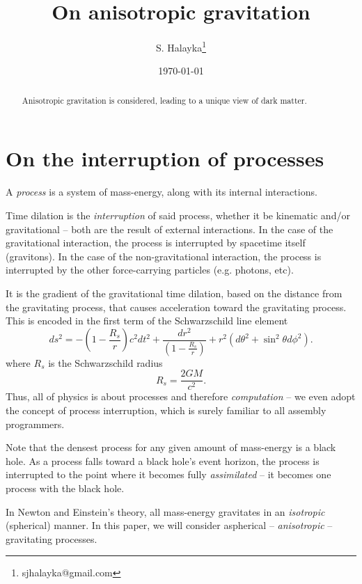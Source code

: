 \documentclass[12pt]{article}
\title{On anisotropic gravitation}
\author{S. Halayka\footnote{sjhalayka@gmail.com}}
\date{\today}
\begin{document}
 
\maketitle

\begin{abstract}
Anisotropic gravitation is considered, leading to a unique view of dark matter.
\end{abstract}






\section{On the interruption of processes}

A {\textit{process}} is a system of mass-energy, along with its internal interactions.

Time dilation is the {\textit{interruption}} of said process, whether it be kinematic and/or gravitational -- both are the result of external interactions.
In the case of the gravitational interaction, the process is interrupted by spacetime itself (gravitons).
In the case of the non-gravitational interaction, the process is interrupted by the other force-carrying particles (e.g. photons, etc).

It is the gradient of the gravitational time dilation, based on the distance from the gravitating process, that causes acceleration toward the gravitating process.
This is encoded in the first term of the Schwarzschild line element
\begin{equation}
ds^2 = -\left( 1 - \frac{R_s}{r} \right) c^2 dt^2 + \frac{dr^2}{\left( 1 - \frac{R_s}{r} \right)} + r^2 (d\theta^2 + \sin^2 \theta d\phi^2).
\end{equation}
where $R_s$ is the Schwarzschild radius
\begin{equation}
R_s = \frac{2GM}{c^2}.
\end{equation}
Thus, all of physics is about processes and therefore {\textit{computation}} -- we even adopt the concept of process interruption, which is surely familiar to all assembly programmers.

Note that the densest process for any given amount of mass-energy is a black hole.
As a process falls toward a black hole's event horizon, the process is interrupted to the point where it becomes fully {\textit{assimilated}} -- it becomes one process with the black hole.

In Newton and Einstein's theory, all mass-energy gravitates in an {\textit{isotropic}} (spherical) manner.
In this paper, we will consider aspherical -- {\textit{anisotropic}} -- gravitating processes.
\end{document}

